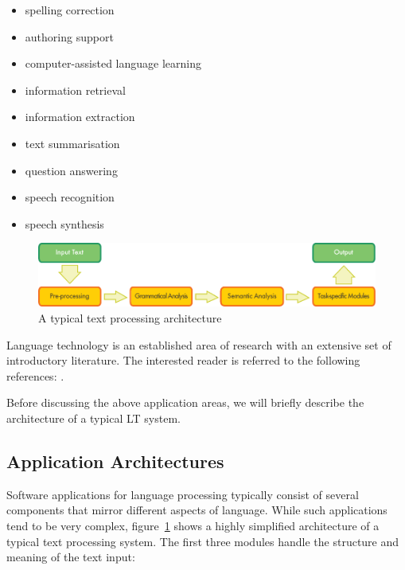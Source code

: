 \documentclass[]{../../metanetpaper}
\begin{document}
\begin{multicols}{2}
\begin{itemize}
\item spelling correction
\item authoring support
\item computer-assisted language learning
\item information retrieval 
\item information extraction
\item text summarisation
\item question answering
\item speech recognition 
\item speech synthesis 
\end{itemize}

\begin{figure}[b]
  \center
  \includegraphics[width=\textwidth]{../_media/english/text_processing_app_architecture}
  \caption{A typical text processing architecture}
  \label{fig:textprocessingarch_en}
\end{figure}

Language technology is an established area of research with an extensive set of introductory literature. The interested reader is referred to the following references:  \cite{jurafsky-martin01, manning-schuetze1, lt-world1, lt-survey1}.

Before discussing the above application areas, we will briefly describe the architecture of a typical LT system.

\subsection{Application Architectures}

Software applications for language processing typically consist of several components that mirror different aspects of language. While such applications tend to be very complex, figure~\ref{fig:textprocessingarch_en} shows a highly simplified architecture of a typical text processing system. The first three modules handle the structure and meaning of the text input:


\end{multicols}
\end{document}
